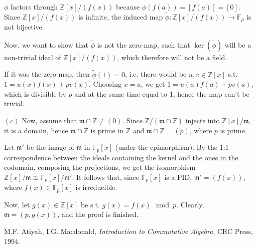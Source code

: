 \documentclass{article}
\newcommand{\numberset}{\mathbb}
\newcommand{\Z}{\numberset{Z}}
\newcommand{\F}{\numberset{F}}
\newcommand{\mi}{\mathfrak{m}}
\begin{document}
$\phi$ factors through $\Z[x]/(f(x))$ because $\phi(f(a))=[f(a)]=[0]$. Since $\Z[x]/(f(x))$ is infinite, the induced map $\tilde{\phi}:\Z[x]/(f(x))\rightarrow\F_{p}$ is not bijective.

Now, we want to show that $\tilde{\phi}$ is not the zero-map, such that  $\ker(\tilde{\phi})$ will be a non-trivial ideal of $\Z[x]/(f(x))$, which therefore will not be a field.

If it was the zero-map, then $\tilde{\phi}(1)=0$, i.e. there would be $u,v\in\Z[x]$ s.t. $1=u(x)f(x)+pv(x)$. Choosing $x=a$, we get $1=u(a)f(a)+pv(a)$, which is divisible by $p$ and at the same time equal to 1, hence the map can't be trivial.

$(c)$ Now, assume that $\mi\cap\Z\neq(0)$. Since $\Z/(\mi\cap\Z)$ injects into $\Z[x]/\mi$, it is a domain, hence $\mi\cap\Z$ is prime in $\Z$ and $\mi\cap\Z=(p)$, where $p$ is prime.

Let $\mi'$ be the image of $\mi$ in $\F_{p}[x]$ (under the epimorphism). By the 1:1 correspondence between the ideals containing the kernel and the ones in the codomain, composing the projections, we get the isomorphism $\Z[x]/\mi\cong \F_{p}[x]/\mi'$. It follows that, since $\F_{p}[x]$ is a PID, $\mi'=(f(x))$, where $f(x)\in\F_{p}[x]$ is irreducible.

Now, let $g(x)\in\Z[x]$ be s.t. $g(x)=f(x)\mod p$. Clearly, $\mi=(p,g(x))$, and the proof is finished.


\begin{thebibliography}{9}
		M.F. Atiyah, I.G. Macdonald,
		\textit{Introduction to Commutative Algebra},
		CRC Press,
		1994.
\end{thebibliography}
\end{document}
